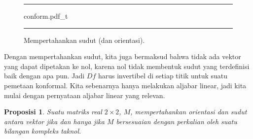 \documentclass[12pt,openany]{book}
\theoremstyle{plain}
\newtheorem{prop}[thm]{Proposisi}
\theoremstyle{remark}
\theoremstyle{definition}
\newenvironment{myfig}{%
\begin{figure}[h!t]
\noindent\rule{\textwidth}{0.5pt}\vspace{12pt}\par\centering}%
{\par\noindent\rule{\textwidth}{0.5pt}
\end{figure}}
\theoremstyle{exercise}
\theoremstyle{example}
\begin{document}
\begin{myfig}
{conform.pdf_t}
\caption{Mempertahankan sudut (dan orientasi).\label{fig:conform}}
\end{myfig}

Dengan mempertahankan sudut, kita juga bermaksud bahwa tidak ada vektor yang dapat dipetakan ke nol,
karena nol tidak membentuk sudut yang terdefinisi baik dengan apa pun.
Jadi $Df$ harus invertibel di setiap titik untuk suatu pemetaan konformal.
Kita sebenarnya hanya melakukan aljabar linear, jadi kita mulai dengan pernyataan
aljabar linear yang relevan.

\begin{prop}
Suatu matriks real $2\times 2$, $M$,
mempertahankan orientasi dan sudut
antara vektor
jika dan hanya jika $M$ bersesuaian dengan perkalian oleh suatu bilangan
kompleks taknol.
\end{prop}
\end{document}
